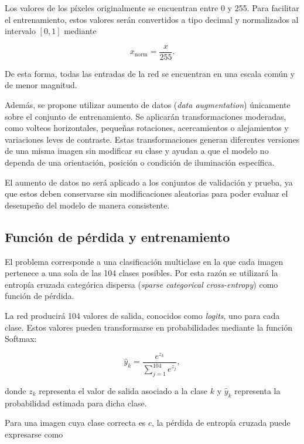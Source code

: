 Los valores de los píxeles originalmente se encuentran entre 0 y 255. Para facilitar el entrenamiento, estos valores serán convertidos a tipo decimal y normalizados al intervalo $[0,1]$ mediante

\begin{equation}
    x_{\text{norm}} = \frac{x}{255}.
\end{equation}

De esta forma, todas las entradas de la red se encuentran en una escala común y de menor magnitud.

Además, se propone utilizar aumento de datos (\textit{data augmentation}) únicamente sobre el conjunto de entrenamiento. Se aplicarán transformaciones moderadas, como volteos horizontales, pequeñas rotaciones, acercamientos o alejamientos y variaciones leves de contraste. Estas transformaciones generan diferentes versiones de una misma imagen sin modificar su clase y ayudan a que el modelo no dependa de una orientación, posición o condición de iluminación específica.

El aumento de datos no será aplicado a los conjuntos de validación y prueba, ya que estos deben conservarse sin modificaciones aleatorias para poder evaluar el desempeño del modelo de manera consistente.


\subsection{Función de pérdida y entrenamiento}

El problema corresponde a una clasificación multiclase en la que cada imagen pertenece a una sola de las 104 clases posibles. Por esta razón se utilizará la entropía cruzada categórica dispersa (\textit{sparse categorical cross-entropy}) como función de pérdida.

La red producirá 104 valores de salida, conocidos como \textit{logits}, uno para cada clase. Estos valores pueden transformarse en probabilidades mediante la función Softmax:

\begin{equation}
    \hat{y}_k =
    \frac{e^{z_k}}
    {\sum_{j=1}^{104} e^{z_j}},
\end{equation}

donde $z_k$ representa el valor de salida asociado a la clase $k$ y $\hat{y}_k$ representa la probabilidad estimada para dicha clase.

Para una imagen cuya clase correcta es $c$, la pérdida de entropía cruzada puede expresarse como

